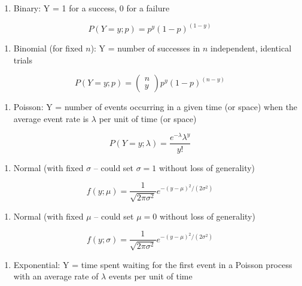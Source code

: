 \documentclass[
]{krantz}
\providecommand{\tightlist}{%
  \setlength{\itemsep}{0pt}\setlength{\parskip}{0pt}}
\begin{document}
\begin{enumerate}
\def\labelenumi{\alph{enumi})}
\tightlist
\item
  Binary: Y = 1 for a success, 0 for a failure
\end{enumerate}

\[P(Y=y;p)=p^{y}(1-p)^{(1-y)}
  \]

\begin{enumerate}
\def\labelenumi{\alph{enumi})}
\setcounter{enumi}{1}
\tightlist
\item
  Binomial (for fixed \(n\)): Y = number of successes in \(n\) independent, identical trials
\end{enumerate}

\[P(Y=y;p)=\left(\begin{array} {c}  n\\y  \end{array}\right) p^y(1-p)^{(n-y)}
  \]

\begin{enumerate}
\def\labelenumi{\alph{enumi})}
\setcounter{enumi}{2}
\tightlist
\item
  Poisson: Y = number of events occurring in a given time (or space) when the average event rate is \(\lambda\) per unit of time (or space)
\end{enumerate}

\[
  P(Y=y; \lambda)=\frac{e^{-\lambda}\lambda^y}{y!}
  \]

\begin{enumerate}
\def\labelenumi{\alph{enumi})}
\setcounter{enumi}{3}
\tightlist
\item
  Normal (with fixed \(\sigma\) -- could set \(\sigma=1\) without loss of generality)
\end{enumerate}

\[f(y; \mu)=\frac{1}{\sqrt{2\pi\sigma^2}}e^{-{(y-\mu)^2}/{(2\sigma^2)}}\]

\begin{enumerate}
\def\labelenumi{\alph{enumi})}
\setcounter{enumi}{4}
\tightlist
\item
  Normal (with fixed \(\mu\) -- could set \(\mu=0\) without loss of generality)
\end{enumerate}

\[f(y; \sigma)=\frac{1}{\sqrt{2\pi\sigma^2}}e^{-{(y-\mu)^2}/{(2\sigma^2)}}\]

\begin{enumerate}
\def\labelenumi{\alph{enumi})}
\setcounter{enumi}{5}
\tightlist
\item
  Exponential: Y = time spent waiting for the first event in a Poisson process with an average rate of \(\lambda\) events per unit of time
\end{enumerate}
\end{document}
